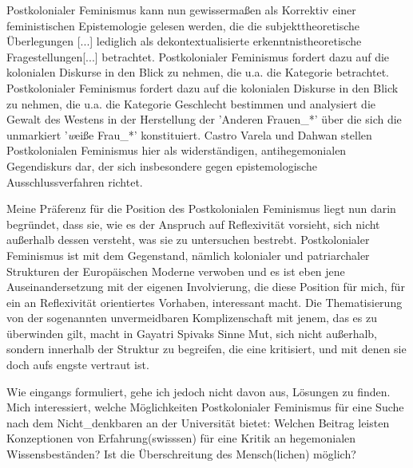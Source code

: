 Postkolonialer Feminismus kann nun gewissermaßen als Korrektiv einer
feministischen Epistemologie gelesen werden, die die \glqq subjekttheoretische
Überlegungen [...] lediglich als dekontextualisierte erkenntnistheoretische
Fragestellungen[...] \grqq \footnotemark {} betrachtet. Postkolonialer Feminismus
fordert dazu auf die kolonialen Diskurse in den Blick zu nehmen, die u.a. die
Kategorie betrachtet. Postkolonialer Feminismus fordert dazu auf die kolonialen
Diskurse in den Blick zu nehmen, die u.a. die Kategorie Geschlecht bestimmen
und \glqq analysiert die Gewalt des Westens \grqq \footnotemark
{} in der Herstellung der 'Anderen
Frauen\_*' über die sich die unmarkiert '\textit{w}eiße Frau\_*' konstituiert.
Castro Varela und Dahwan stellen Postkolonialen Feminismus hier als
\glqq widerständigen, antihegemonialen Gegendiskurs dar, der sich insbesondere gegen
epistemologische Ausschlussverfahren richtet.\grqq \footnotemark
{}

Meine Präferenz für die Position des Postkolonialen Feminismus liegt nun darin
begründet, dass sie, wie es der Anspruch auf Reflexivität vorsieht, sich nicht
außerhalb dessen versteht, was sie zu untersuchen bestrebt. Postkolonialer
Feminismus ist mit dem Gegenstand, nämlich kolonialer und patriarchaler
Strukturen der Europäischen Moderne verwoben und es ist eben jene
Auseinandersetzung mit der eigenen Involvierung, die diese Position für mich,
für ein an Reflexivität orientiertes Vorhaben, interessant macht. Die
Thematisierung von der sogenannten unvermeidbaren Komplizenschaft mit jenem,
das es zu überwinden gilt, macht in Gayatri Spivaks Sinne Mut, sich nicht
außerhalb, sondern innerhalb der Struktur zu begreifen, die eine kritisiert,
und mit denen sie doch \glqq aufs engste vertraut ist. \grqq \footnotemark 
{}

Wie eingangs formuliert, gehe ich jedoch nicht davon aus, Lösungen zu finden.
Mich interessiert, welche Möglichkeiten Postkolonialer Feminismus für eine
Suche nach dem Nicht\_denkbaren an der Universität bietet: Welchen Beitrag
leisten Konzeptionen von Erfahrung(swisssen) für eine Kritik an hegemonialen
Wissensbeständen? Ist die Überschreitung des Mensch(lichen) möglich?

